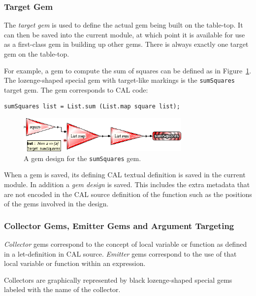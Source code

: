 \documentclass[preprint]{sigplanconf}
\begin{document}
\subsubsection{Target Gem}
\label{sec:targetGem}

The {\it target gem} is used to define the actual gem being built on
the table-top. It can then be saved into the current module, at which
point it is available for use as a first-class gem in building up
other gems. There is always exactly one target gem on the table-top.

For example, a gem to compute the sum of squares can be defined as
in Figure~\ref{fig:sumSquares}. The lozenge-shaped special gem with
target-like markings is the {\tt sumSquares} target gem.
The gem corresponds to CAL code:
\begin{verbatim}
sumSquares list = List.sum (List.map square list);
\end{verbatim}

\begin{figure}[htb]
  \centering
  \includegraphics[width=20pc]{sumSquares.png}
  \caption{A gem design for the {\tt sumSquares} gem.}
  \label{fig:sumSquares}
\end{figure}

When a gem is saved, its defining CAL textual definition is saved in
the current module. In addition a {\it gem design} is saved. This
includes the extra metadata that are not encoded in the CAL source
definition of the function such as the positions of the gems involved
in the design.

\subsubsection{Collector Gems, Emitter Gems and Argument Targeting}
\label{sec:collectorEmitter}

{\it Collector} gems correspond to the concept of local variable or
function as defined in a let-definition in CAL source. {\it Emitter}
gems correspond to the use of that local variable or function within
an expression.

Collectors are graphically represented by black lozenge-shaped special
gems labeled with the name of the collector.
\end{document}
